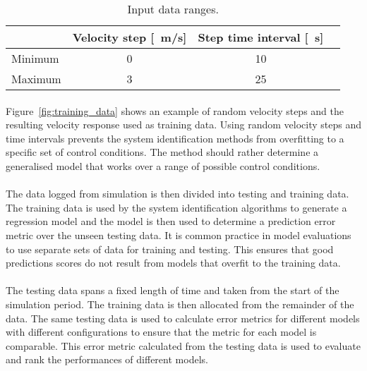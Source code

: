         \begin{table}[!h]
            \renewcommand{\arraystretch}{1.1}
            \centering
            \caption{Input data ranges.}
            \begin{tabularx}{0.65\linewidth}{@{}lCCr@{}}
                \toprule
                         & Velocity step [\SI{}{\metre/\second}]  & Step time interval [\SI{}{\second}]\\
                \midrule
                Minimum  & 0                                    & 10\\
                Maximum  & 3                                    & 25\\
                \bottomrule
            \end{tabularx}
            \label{tbl:input_ranges}
        \end{table}
        
        

        \paragraph{}
        Figure~\ref{fig:training_data} 
        shows an example of random velocity steps and the resulting velocity response used as training data.
        Using random velocity steps and time intervals prevents the system identification methods 
        from overfitting to a specific set of control conditions.
        The method should rather determine a generalised model 
        that works over a range of possible control conditions.

        \paragraph{}
        The data logged from simulation is then divided into testing and training data.
        The training data is used by the system identification algorithms to generate a regression model 
        and the model is then used to determine a prediction error metric over the unseen testing data.
        It is common practice in model evaluations 
        to use separate sets of data for training and testing.
        This ensures that good predictions scores do not result from models that overfit to the training data. 
        
        \paragraph{}
        The testing data spans a fixed length of time and taken from the start of the simulation period.
        The training data is then allocated from the remainder of the data.
        The same testing data is used to calculate error metrics for different models with different configurations
        to ensure that the metric for each model is comparable. 
        This error metric calculated from the testing data is used to evaluate and rank the performances of different models.       

